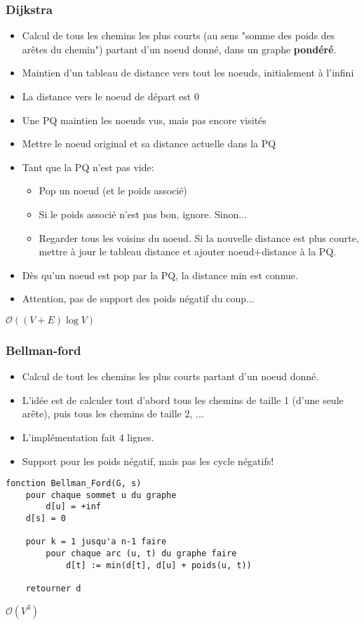 \documentclass[8pt,aspectratio=169]{beamer}
\begin{document}
\begin{frame}
\frametitle{Dijkstra}
\begin{itemize}
	\item Calcul de tous les chemins les plus courts (au sens "somme des poids des arêtes du chemin") partant d'un noeud donné, dans un graphe \textbf{pondéré}.
	\item Maintien d'un tableau de distance vers tout les noeuds, initialement à l'infini
	\item La distance vers le noeud de départ est 0
	\item Une PQ maintien les noeuds vus, mais pas encore visités
	\item Mettre le noeud original et sa distance actuelle dans la PQ
	\item Tant que la PQ n'est pas vide:
	\begin{itemize}
		\item Pop un noeud (et le poids associé)
		\item Si le poids associé n'est pas bon, ignore. Sinon...
		\item Regarder tous les voisins du noeud. Si la nouvelle distance est plus courte, mettre à jour le tableau distance et ajouter noeud+distance à la PQ.
	\end{itemize}
	\item Dès qu'un noeud est pop par la PQ, la distance min est connue.
	\item Attention, pas de support des poids négatif du coup...
\end{itemize}
$\mathcal{O}((V+E)\log V)$
\end{frame}

\begin{frame}[fragile]
\frametitle{Bellman-ford}
\begin{itemize}
	\item Calcul de tout les chemins les plus courts partant d'un noeud donné.
	\item L'idée est de calculer tout d'abord tous les chemins de taille 1 (d'une seule arête), puis tous les chemins de taille 2, ...
	\item L'implémentation fait 4 lignes.
	\item Support pour les poids négatif, mais pas les cycle négatifs!
\end{itemize}

\begin{lstlisting}
fonction Bellman_Ford(G, s) 
	pour chaque sommet u du graphe
		d[u] = +inf
	d[s] = 0

	pour k = 1 jusqu'a n-1 faire
		pour chaque arc (u, t) du graphe faire
			d[t] := min(d[t], d[u] + poids(u, t))
	
	retourner d
\end{lstlisting}
$\mathcal{O}(V^3)$
\end{frame}
\end{document}
